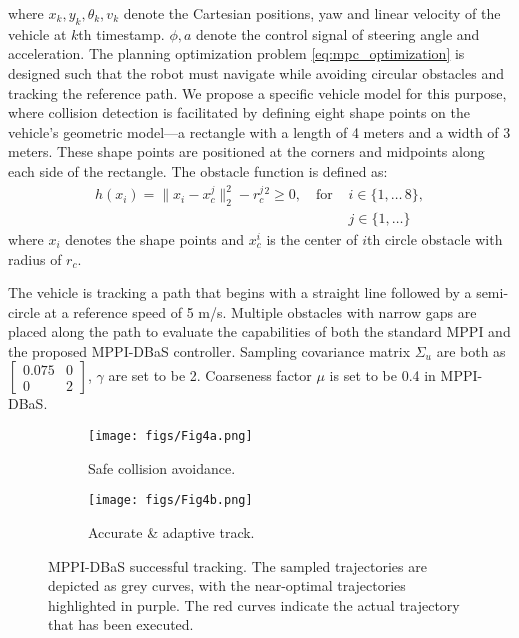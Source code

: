 \documentclass[english]{cccconf}
\begin{document}
where $x_{k}, y_{k}, \theta_{k}, v_k$ denote the Cartesian positions, yaw and linear velocity of the vehicle at $k$th timestamp. $\phi, a$ denote the control signal of steering angle and acceleration. The planning optimization problem \eqref{eq:mpc_optimization} is designed such that the robot must navigate while avoiding circular obstacles and tracking the reference path. We propose a specific vehicle model for this purpose, where collision detection is facilitated by defining eight shape points on the vehicle's geometric model—a rectangle with a length of 4 meters and a width of 3 meters. These shape points are positioned at the corners and midpoints along each side of the rectangle. The obstacle function is defined as:
\begin{equation*}
    \begin{aligned}
   h(x_i) =\| x_i - x_c^j \|_2^2 - r_c^j{^2} \geq 0, \quad \text{for } &i \in \{ 1, \dots \, 8\}, \\
   &j\in \{1, \dots \}
   \end{aligned}
\end{equation*}
where $x_i$ denotes the shape points and $x_c^i$ is the center of $i$th circle obstacle with radius of $r_c$.

The vehicle is tracking a path that begins with a straight line followed by a semi-circle at a reference speed of 5 m/s. Multiple obstacles with narrow gaps are placed along the path to evaluate the capabilities of both the standard MPPI and the proposed MPPI-DBaS controller. Sampling covariance matrix $\Sigma_u$ are both as $\begin{bmatrix} 0.075& 0 \\ 0& 2 \end{bmatrix}$, $\gamma$ are set to be 2. Coarseness factor $\mu$ is set to be 0.4 in MPPI-DBaS.

\begin{figure}[!b]
     \centering
     \begin{subfigure}{0.235\textwidth}
         \centering
         \texttt{[image: figs/Fig4a.png]}
         \caption{Safe collision avoidance.}
         \label{fig4a}
     \end{subfigure}
     \hfill
     \begin{subfigure}{0.235\textwidth}
         \centering
         \texttt{[image: figs/Fig4b.png]}
         \caption{Accurate \& adaptive track.}
         \label{fig4b}
     \end{subfigure}
         \caption{MPPI-DBaS successful tracking. The sampled trajectories are depicted as grey curves, with the near-optimal trajectories highlighted in purple. The red curves indicate the actual trajectory that has been executed.}
        \label{fig4}
\end{figure}
\end{document}
